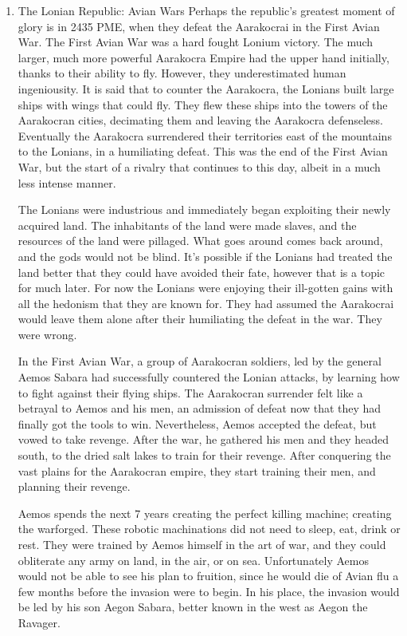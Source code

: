 \documentclass[11pt]{article}
\begin{document}
\begin{enumerate}
\item The Lonian Republic: Avian Wars
\label{sec:org3a966d6}
Perhaps the republic's greatest moment of glory is in 2435 PME, when they defeat the Aarakocrai in the First Avian War. The First Avian War was a hard fought Lonium victory. The much larger, much more powerful Aarakocra Empire had the upper hand initially, thanks to their ability to fly. However, they underestimated human ingeniousity. It is said that to counter the Aarakocra, the Lonians built large ships with wings that could fly. They flew these ships into the towers of the Aarakocran cities, decimating them and leaving the Aarakocra defenseless. Eventually the Aarakocra surrendered their territories east of the mountains to the Lonians, in a humiliating defeat. This was the end of the First Avian War, but the start of a rivalry that continues to this day, albeit in a much less intense manner.

The Lonians were industrious and immediately began exploiting their newly acquired land. The inhabitants of the land were made slaves, and the resources of the land were pillaged. What goes around comes back around, and the gods would not be blind. It's possible if the Lonians had treated the land better that they could have avoided their fate, however that is a topic for much later. For now the Lonians were enjoying their ill-gotten gains with all the hedonism that they are known for. They had assumed the Aarakocrai would leave them alone after their humiliating the defeat in the war. They were wrong.

In the First Avian War, a group of Aarakocran soldiers, led by the general Aemos Sabara had successfully countered the Lonian attacks, by learning how to fight against their flying ships. The Aarakocran surrender felt like a betrayal to Aemos and his men, an admission of defeat now that they had finally got the tools to win. Nevertheless, Aemos accepted the defeat, but vowed to take revenge. After the war, he gathered his men and they headed south, to the dried salt lakes to train for their revenge. After conquering the vast plains for the Aarakocran empire, they start training their men, and planning their revenge.

Aemos spends the next 7 years creating the perfect killing machine; creating the warforged. These robotic machinations did not need to sleep, eat, drink or rest. They were trained by Aemos himself in the art of war, and they could obliterate any army on land, in the air, or on sea. Unfortunately Aemos would not be able to see his plan to fruition, since he would die of Avian flu a few months before the invasion were to begin. In his place, the invasion would be led by his son Aegon Sabara, better known in the west as Aegon the Ravager.


\end{enumerate}
\end{document}
